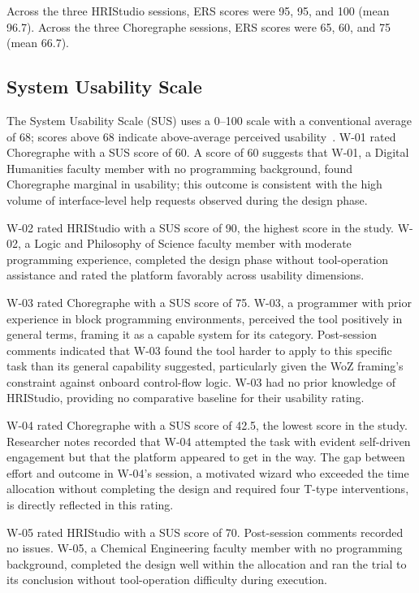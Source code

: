 Across the three HRIStudio sessions, ERS scores were 95, 95, and 100 (mean 96.7). Across the three Choregraphe sessions, ERS scores were 65, 60, and 75 (mean 66.7).

\subsection{System Usability Scale}

The System Usability Scale (SUS) uses a 0--100 scale with a conventional average of 68; scores above 68 indicate above-average perceived usability~\cite{Brooke1996}. W-01 rated Choregraphe with a SUS score of 60. A score of 60 suggests that W-01, a Digital Humanities faculty member with no programming background, found Choregraphe marginal in usability; this outcome is consistent with the high volume of interface-level help requests observed during the design phase.

W-02 rated HRIStudio with a SUS score of 90, the highest score in the study. W-02, a Logic and Philosophy of Science faculty member with moderate programming experience, completed the design phase without tool-operation assistance and rated the platform favorably across usability dimensions.

W-03 rated Choregraphe with a SUS score of 75. W-03, a programmer with prior experience in block programming environments, perceived the tool positively in general terms, framing it as a capable system for its category. Post-session comments indicated that W-03 found the tool harder to apply to this specific task than its general capability suggested, particularly given the WoZ framing's constraint against onboard control-flow logic. W-03 had no prior knowledge of HRIStudio, providing no comparative baseline for their usability rating.

W-04 rated Choregraphe with a SUS score of 42.5, the lowest score in the study. Researcher notes recorded that W-04 attempted the task with evident self-driven engagement but that the platform appeared to get in the way. The gap between effort and outcome in W-04's session, a motivated wizard who exceeded the time allocation without completing the design and required four T-type interventions, is directly reflected in this rating.

W-05 rated HRIStudio with a SUS score of 70. Post-session comments recorded no issues. W-05, a Chemical Engineering faculty member with no programming background, completed the design well within the allocation and ran the trial to its conclusion without tool-operation difficulty during execution.

